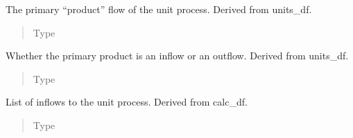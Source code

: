\documentclass[a4paper,10pt,english]{sphinxmanual}
\begin{document}
\begin{fulllineitems}
\begin{fulllineitems}
\label{\detokenize{unit:unitprocess.UnitProcess.default_product}}
The primary “product” flow of the unit
process. Derived from units\_df.
\begin{quote}\begin{description}
\item[{Type}] \leavevmode
{}

\end{description}\end{quote}

\end{fulllineitems}


\begin{fulllineitems}
\label{\detokenize{unit:unitprocess.UnitProcess.default_io}}
Whether the primary product is an inflow
or an outflow. Derived from units\_df.
\begin{quote}\begin{description}
\item[{Type}] \leavevmode
{}

\end{description}\end{quote}

\end{fulllineitems}


\begin{fulllineitems}
\label{\detokenize{unit:unitprocess.UnitProcess.inflows}}
List of inflows to the unit process. Derived
from calc\_df.
\begin{quote}\begin{description}
\item[{Type}] \leavevmode
\sphinxhref{https://docs.python.org/3/library/stdtypes.html\#set}{set}{[}\sphinxhref{https://docs.python.org/3/library/stdtypes.html\#str}{str}{]}

\end{description}\end{quote}


\end{fulllineitems}
\end{fulllineitems}
\end{document}
